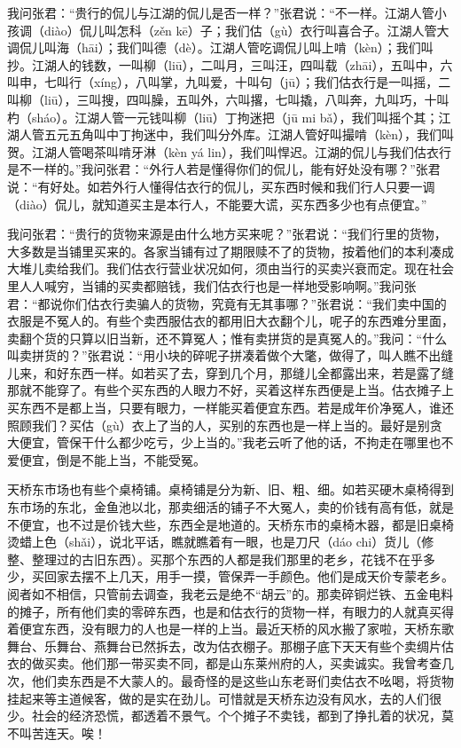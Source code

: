 \documentclass[12pt,UTF8]{ctexbook}
\begin{document}
我问张君：“贵行的侃儿与江湖的侃儿是否一样？”张君说：“不一样。江湖人管小孩调（diào）侃儿叫怎科（zěn kē）子；我们估（gù）衣行叫喜合子。江湖人管大调侃儿叫海（hāi）；我们叫德（dè）。江湖人管吃调侃儿叫上啃（kèn）；我们叫抄。江湖人的钱数，一叫柳（liū），二叫月，三叫汪，四叫载（zhāi），五叫中，六叫申，七叫行（xíng），八叫掌，九叫爱，十叫句（jū）；我们估衣行是一叫摇，二叫柳（liū），三叫搜，四叫臊，五叫外，六叫撂，七叫撬，八叫奔，九叫巧，十叫杓（sháo）。江湖人管一元钱叫柳（liū）丁拘迷把（jū mi bǎ），我们叫摇个其；江湖人管五元五角叫中丁拘迷中，我们叫分外库。江湖人管好叫撮啃（kèn），我们叫贺。江湖人管喝茶叫啃牙淋（kèn yá lin），我们叫悍迟。江湖的侃儿与我们估衣行是不一样的。”我问张君：“外行人若是懂得你们的侃儿，能有好处没有哪？”张君说：“有好处。如若外行人懂得估衣行的侃儿，买东西时候和我们行人只要一调（diào）侃儿，就知道买主是本行人，不能要大谎，买东西多少也有点便宜。”

我问张君：“贵行的货物来源是由什么地方买来呢？”张君说：“我们行里的货物，大多数是当铺里买来的。各家当铺有过了期限赎不了的货物，按着他们的本利凑成大堆儿卖给我们。我们估衣行营业状况如何，须由当行的买卖兴衰而定。现在社会里人人喊穷，当铺的买卖都赔钱，我们估衣行也是一样地受影响啊。”我问张君：“都说你们估衣行卖骗人的货物，究竟有无其事哪？”张君说：“我们卖中国的衣服是不冤人的。有些个卖西服估衣的都用旧大衣翻个儿，呢子的东西难分里面，卖翻个货的只算以旧当新，还不算冤人；惟有卖拼货的是真冤人的。”我问：“什么叫卖拼货的？”张君说：“用小块的碎呢子拼凑着做个大氅，做得了，叫人瞧不出缝儿来，和好东西一样。如若买了去，穿到几个月，那缝儿全都露出来，若是露了缝那就不能穿了。有些个买东西的人眼力不好，买着这样东西便是上当。估衣摊子上买东西不是都上当，只要有眼力，一样能买着便宜东西。若是成年价净冤人，谁还照顾我们？买估（gù）衣上了当的人，买别的东西也是一样上当的。最好是别贪大便宜，管保干什么都少吃亏，少上当的。”我老云听了他的话，不拘走在哪里也不爱便宜，倒是不能上当，不能受冤。

天桥东市场也有些个桌椅铺。桌椅铺是分为新、旧、粗、细。如若买硬木桌椅得到东市场的东北，金鱼池以北，那卖细活的铺子不大冤人，卖的价钱有高有低，就是不便宜，也不过是价钱大些，东西全是地道的。天桥东市的桌椅木器，都是旧桌椅烫蜡上色（shǎi），说北平话，瞧就瞧着有一眼，也是刀尺（dáo chi）货儿（修整、整理过的古旧东西）。买那个东西的人都是我们那里的老乡，花钱不在乎多少，买回家去摆不上几天，用手一摸，管保弄一手颜色。他们是成天价专蒙老乡。阅者如不相信，只管前去调查，我老云是绝不“胡云”的。那卖碎铜烂铁、五金电料的摊子，所有他们卖的零碎东西，也是和估衣行的货物一样，有眼力的人就真买得着便宜东西，没有眼力的人也是一样的上当。最近天桥的风水搬了家啦，天桥东歌舞台、乐舞台、燕舞台已然拆去，改为估衣棚子。那棚子底下天天有些个卖绸片估衣的做买卖。他们那一带买卖不同，都是山东莱州府的人，买卖诚实。我曾考查几次，他们卖东西是不大蒙人的。最奇怪的是这些山东老哥们卖估衣不吆喝，将货物挂起来等主道候客，做的是实在劲儿。可惜就是天桥东边没有风水，去的人们很少。社会的经济恐慌，都透着不景气。个个摊子不卖钱，都到了挣扎着的状况，莫不叫苦连天。唉！
\end{document}
